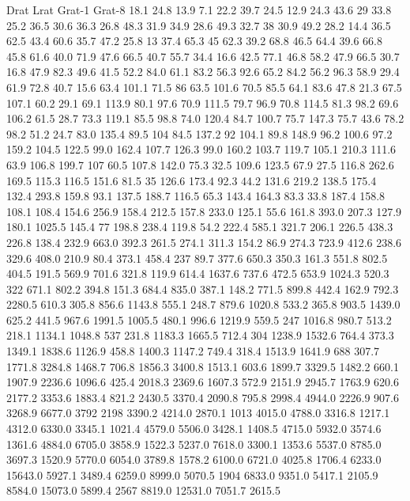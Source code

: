Drat	Lrat	Grat-1	Grat-8
18.1	24.8	13.9	7.1
22.2	39.7	24.5	12.9
24.3	43.6	29	33.8
25.2	36.5	30.6	36.3
26.8	48.3	31.9	34.9
28.6	49.3	32.7	38
30.9	49.2	28.2	14.4
36.5	62.5	43.4	60.6
35.7	47.2	25.8	13
37.4	65.3	45	62.3
39.2	68.8	46.5	64.4
39.6	66.8	45.8	61.6
40.0	71.9	47.6	66.5
40.7	55.7	34.4	16.6
42.5	77.1	46.8	58.2
47.9	66.5	30.7	16.8
47.9	82.3	49.6	41.5
52.2	84.0	61.1	83.2
56.3	92.6	65.2	84.2
56.2	96.3	58.9	29.4
61.9	72.8	40.7	15.6
63.4	101.1	71.5	86
63.5	101.6	70.5	85.5
64.1	83.6	47.8	21.3
67.5	107.1	60.2	29.1
69.1	113.9	80.1	97.6
70.9	111.5	79.7	96.9
70.8	114.5	81.3	98.2
69.6	106.2	61.5	28.7
73.3	119.1	85.5	98.8
74.0	120.4	84.7	100.7
75.7	147.3	75.7	43.6
78.2	98.2	51.2	24.7
83.0	135.4	89.5	104
84.5	137.2	92	104.1
89.8	148.9	96.2	100.6
97.2	159.2	104.5	122.5
99.0	162.4	107.7	126.3
99.0	160.2	103.7	119.7
105.1	210.3	111.6	63.9
106.8	199.7	107	60.5
107.8	142.0	75.3	32.5
109.6	123.5	67.9	27.5
116.8	262.6	169.5	115.3
116.5	151.6	81.5	35
126.6	173.4	92.3	44.2
131.6	219.2	138.5	175.4
132.4	293.8	159.8	93.1
137.5	188.7	116.5	65.3
143.4	164.3	83.3	33.8
187.4	158.8	108.1	108.4
154.6	256.9	158.4	212.5
157.8	233.0	125.1	55.6
161.8	393.0	207.3	127.9
180.1	1025.5	145.4	77
198.8	238.4	119.8	54.2
222.4	585.1	321.7	206.1
226.5	438.3	226.8	138.4
232.9	663.0	392.3	261.5
274.1	311.3	154.2	86.9
274.3	723.9	412.6	238.6
329.6	408.0	210.9	80.4
373.1	458.4	237	89.7
377.6	650.3	350.3	161.3
551.8	802.5	404.5	191.5
569.9	701.6	321.8	119.9
614.4	1637.6	737.6	472.5
653.9	1024.3	520.3	322
671.1	802.2	394.8	151.3
684.4	835.0	387.1	148.2
771.5	899.8	442.4	162.9
792.3	2280.5	610.3	305.8
856.6	1143.8	555.1	248.7
879.6	1020.8	533.2	365.8
903.5	1439.0	625.2	441.5
967.6	1991.5	1005.5	480.1
996.6	1219.9	559.5	247
1016.8	980.7	513.2	218.1
1134.1	1048.8	537	231.8
1183.3	1665.5	712.4	304
1238.9	1532.6	764.4	373.3
1349.1	1838.6	1126.9	458.8
1400.3	1147.2	749.4	318.4
1513.9	1641.9	688	307.7
1771.8	3284.8	1468.7	706.8
1856.3	3400.8	1513.1	603.6
1899.7	3329.5	1482.2	660.1
1907.9	2236.6	1096.6	425.4
2018.3	2369.6	1607.3	572.9
2151.9	2945.7	1763.9	620.6
2177.2	3353.6	1883.4	821.2
2430.5	3370.4	2090.8	795.8
2998.4	4944.0	2226.9	907.6
3268.9	6677.0	3792	2198
3390.2	4214.0	2870.1	1013
4015.0	4788.0	3316.8	1217.1
4312.0	6330.0	3345.1	1021.4
4579.0	5506.0	3428.1	1408.5
4715.0	5932.0	3574.6	1361.6
4884.0	6705.0	3858.9	1522.3
5237.0	7618.0	3300.1	1353.6
5537.0	8785.0	3697.3	1520.9
5770.0	6054.0	3789.8	1578.2
6100.0	6721.0	4025.8	1706.4
6233.0	15643.0	5927.1	3489.4
6259.0	8999.0	5070.5	1904
6833.0	9351.0	5417.1	2105.9
8584.0	15073.0	5899.4	2567
8819.0	12531.0	7051.7	2615.5
